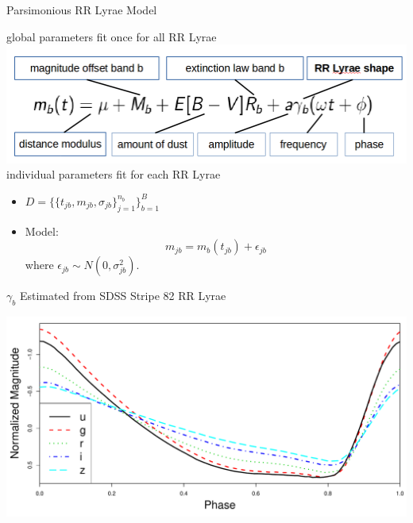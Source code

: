 \documentclass[12pt]{beamer}
\begin{document}
\begin{frame}{Parsimonious RR Lyrae Model}


\begin{center}
global parameters fit once for all RR Lyrae\\
\includegraphics[scale=.3]{figs/model.png}\\
individual parameters fit for each RR Lyrae
\end{center}

\vspace{.2in}

\begin{itemize}
\item $D=\{\{t_{jb},m_{jb},\sigma_{jb}\}_{j=1}^{n_b}\}_{b=1}^B$
\item Model:
\begin{equation*}
m_{jb} = m_b(t_{jb}) + \epsilon_{jb}
\end{equation*}
where $\epsilon_{jb} \sim N(0,\sigma_{jb}^2)$.
\end{itemize}
\end{frame}

\begin{frame}{$\gamma_b$ Estimated from SDSS Stripe 82 RR Lyrae}

\begin{center}
\includegraphics[scale=.3]{figs/templates.pdf}
\end{center}

\end{frame}
\end{document}
